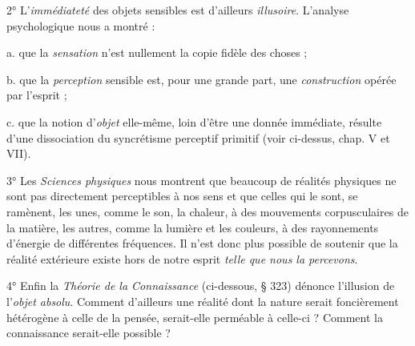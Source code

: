 2° L’{\it immédiateté} des objets sensibles est d’ailleurs {\it illusoire}. L'analyse
psychologique nous a montré :

a. que la {\it sensation} n’est nullement la copie fidèle des choses ;

b. que la {\it perception} sensible est, pour une grande part, une {\it construction}
opérée par l'esprit ;

c. que la notion d’{\it objet} elle-même, loin d’être une donnée immédiate,
résulte d’une dissociation du syncrétisme perceptif primitif (voir
ci-dessus, chap. V et VII).

3° Les {\it Sciences physiques} nous montrent que beaucoup de réalités
physiques ne sont pas directement perceptibles à nos sens et que
celles qui le sont, se ramènent, les unes, comme le son, la chaleur, à
des mouvements corpusculaires de la matière, les autres, comme la
lumière et les couleurs, à des rayonnements d’énergie de différentes
fréquences. Il n’est donc plus possible de soutenir que la réalité extérieure
existe hors de notre esprit {\it telle que nous la percevons}.

4° Enfin la {\it Théorie de la Connaissance} (ci-dessous, § 323) dénonce
l'illusion de l’{\it objet absolu}. Comment d’ailleurs une réalité dont la
nature serait foncièrement hétérogène à celle de la pensée, serait-elle
perméable à celle-ci ? Comment la connaissance serait-elle possible ?

